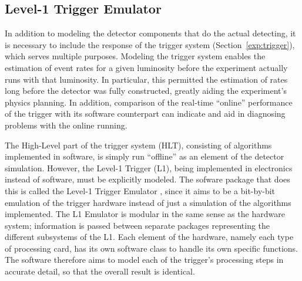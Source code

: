 \subsection{Level-1 Trigger Emulator}
\label{sim:DetectorL1Emul}


In addition to modeling the detector 
components that do the actual detecting, 
it is necessary to include the response of 
the trigger system (Section~\ref{exp:trigger}), %
which serves multiple purposes.  
Modeling the trigger system enables 
the estimation of event rates 
for a given luminosity 
before the experiment actually runs 
with that luminosity.  
In particular, 
this permitted the estimation of rates
long before the detector was fully constructed, 
greatly aiding the experiment's 
physics planning.  
In addition, comparison of the real-time 
``online'' performance of the trigger 
with its software counterpart 
can indicate and aid in diagnosing 
problems with the online running.  

The High-Level part of the trigger system (HLT), 
consisting of algorithms implemented in software, 
is simply run ``offline'' as an element 
of the detector simulation.  
However, the Level-1 Trigger (L1), 
being implemented in electronics 
instead of software, 
must be explicitly modeled.  
The sofware package that does this 
is called the Level-1 Trigger Emulator 
\cite{emulator}, 
since it aims to be a bit-by-bit 
emulation of the trigger hardware 
instead of just a simulation of the 
algorithms implemented.  
The L1 Emulator is modular in the 
same sense as the hardware system; 
information is passed between 
separate packages representing the 
different subsystems of the L1.  
Each element of the hardware, 
namely each type of processing card, 
has its own software class to handle 
its own specific functions.  
The software therefore aims to model 
each of the trigger's processing steps 
in accurate detail, 
so that the overall result is identical.  